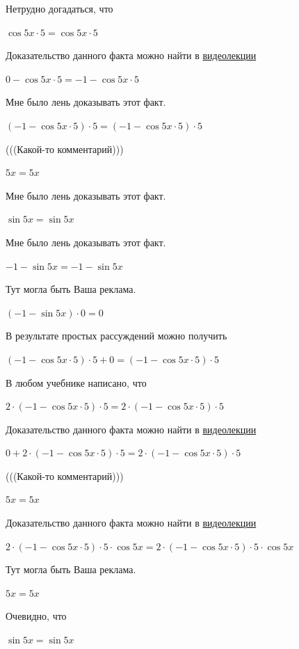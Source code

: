 \documentclass[12pt,a4paper,fleqn]{article}
\theoremstyle{definition}
\begin{document}
Нетрудно догадаться, что 

$\cos 5  x  \cdot  5  = \cos 5  x  \cdot  5 $

Доказательство данного факта можно найти в \href{https://www.youtube.com/watch?v=dQw4w9WgXcQ}{видеолекции} 

$ 0  - \cos 5  x  \cdot  5  =  -1  - \cos 5  x  \cdot  5 $

Мне было лень доказывать этот факт.

$( -1  - \cos 5  x  \cdot  5 ) \cdot  5  = ( -1  - \cos 5  x  \cdot  5 ) \cdot  5 $

(((Какой-то комментарий))) 

$ 5  x  =  5  x $

Мне было лень доказывать этот факт.

$\sin 5  x  = \sin 5  x $

Мне было лень доказывать этот факт.

$ -1  - \sin 5  x  =  -1  - \sin 5  x $

Тут могла быть Ваша реклама. 

$( -1  - \sin 5  x ) \cdot  0  =  0 $

В результате простых рассуждений можно получить 

$( -1  - \cos 5  x  \cdot  5 ) \cdot  5  +  0  = ( -1  - \cos 5  x  \cdot  5 ) \cdot  5 $

В любом учебнике написано, что 

$ 2  \cdot ( -1  - \cos 5  x  \cdot  5 ) \cdot  5  =  2  \cdot ( -1  - \cos 5  x  \cdot  5 ) \cdot  5 $

Доказательство данного факта можно найти в \href{https://www.youtube.com/watch?v=dQw4w9WgXcQ}{видеолекции} 

$ 0  +  2  \cdot ( -1  - \cos 5  x  \cdot  5 ) \cdot  5  =  2  \cdot ( -1  - \cos 5  x  \cdot  5 ) \cdot  5 $

(((Какой-то комментарий))) 

$ 5  x  =  5  x $

Доказательство данного факта можно найти в \href{https://www.youtube.com/watch?v=dQw4w9WgXcQ}{видеолекции} 

$ 2  \cdot ( -1  - \cos 5  x  \cdot  5 ) \cdot  5  \cdot \cos 5  x  =  2  \cdot ( -1  - \cos 5  x  \cdot  5 ) \cdot  5  \cdot \cos 5  x $

Тут могла быть Ваша реклама. 

$ 5  x  =  5  x $

Очевидно, что 

$\sin 5  x  = \sin 5  x $
\end{document}
